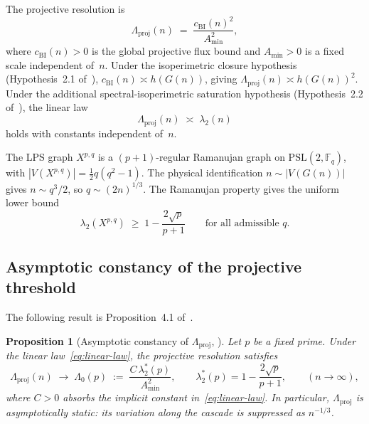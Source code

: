 \documentclass[11pt,a4paper]{article}
\newtheorem{proposition}[theorem]{Proposition}
\newcommand{\Lproj}{\Lambda_{\mathrm{proj}}}
\newcommand{\ltwo}{\lambda_{2}}
\newcommand{\hG}{h\!\left(G(n)\right)}
\begin{document}
      The projective resolution is
      \begin{equation}
        \label{eq:Lproj-def}
        \Lproj(n)
        \;=\;
        \frac{c_{\mathrm{BI}}(n)^{2}}{A_{\min}^{2}},
      \end{equation}
      where $c_{\mathrm{BI}}(n)>0$ is the global projective flux bound and $A_{\min}>0$
      is a fixed scale independent of~$n$.
      Under the isoperimetric closure hypothesis (Hypothesis~2.1
      of~\cite{Beau2026a5}), $c_{\mathrm{BI}}(n)\asymp\hG$, giving
      $\Lproj(n)\asymp h(G(n))^{2}$.
      Under the additional spectral-isoperimetric saturation hypothesis (Hypothesis~2.2
      of~\cite{Beau2026a5}), the linear law
      \begin{equation}
        \label{eq:linear-law}
        \Lproj(n) \;\asymp\; \ltwo(n)
      \end{equation}
      holds with constants independent of~$n$.

      The LPS graph $X^{p,q}$ is a $(p+1)$-regular Ramanujan graph on
      $\mathrm{PSL}(2,\mathbb{F}_{q})$, with $|V(X^{p,q})| = \tfrac{1}{2}q(q^{2}-1)$.
      The physical identification $n\sim|V(G(n))|$ gives $n\sim q^{3}/2$,
      so $q\sim(2n)^{1/3}$.
      The Ramanujan property gives the uniform lower bound
      \begin{equation}
        \label{eq:ramanujan}
        \ltwo\!\left(X^{p,q}\right)
        \;\geq\;
        1 - \frac{2\sqrt{p}}{p+1}
        \qquad \text{for all admissible } q.
      \end{equation}

    \subsection{Asymptotic constancy of the projective threshold}
      \label{subsec:asymptotic-constancy}

      The following result is Proposition~4.1 of~\cite{Beau2026a5}.

      \begin{proposition}[Asymptotic constancy of $\Lproj$, {\cite{SpectralRelaxation}}]
        \label{prop:static}
        Let $p$ be a fixed prime.
        Under the linear law~\eqref{eq:linear-law}, the projective resolution satisfies
        \begin{equation}
          \Lproj(n) \;\longrightarrow\; \Lambda_{0}(p)
          \;:=\; \frac{C\,\lambda_{2}^{*}(p)}{A_{\min}^{2}},
          \qquad
          \lambda_{2}^{*}(p) = 1 - \frac{2\sqrt{p}}{p+1},
          \qquad
          (n\to\infty),
        \end{equation}
        where $C>0$ absorbs the implicit constant in~\eqref{eq:linear-law}.
        In particular, $\Lproj$ is asymptotically static: its variation along the
        cascade is suppressed as $n^{-1/3}$.
      \end{proposition}
\end{document}
